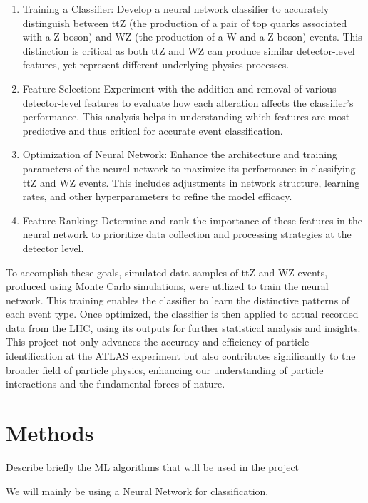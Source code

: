\documentclass[]{article}
\begin{document}
\begin{enumerate}
 \item Training a Classifier: Develop a neural network classifier to accurately distinguish between ttZ (the production of a pair of top quarks associated with a Z boson) and WZ (the production of a W and a Z boson) events. This distinction is critical as both ttZ and WZ can produce similar detector-level features, yet represent different underlying physics processes.
\item Feature Selection: Experiment with the addition and removal of various detector-level features to evaluate how each alteration affects the classifier's performance. This analysis helps in understanding which features are most predictive and thus critical for accurate event classification.
 \item Optimization of Neural Network: Enhance the architecture and training parameters of the neural network to maximize its performance in classifying ttZ and WZ events. This includes adjustments in network structure, learning rates, and other hyperparameters to refine the model efficacy.
 \item Feature Ranking: Determine and rank the importance of these features in the neural network to prioritize data collection and processing strategies at the detector level.

\end{enumerate}
To accomplish these goals, simulated data samples of ttZ and WZ events, produced using Monte Carlo simulations, were utilized to train the neural network. This training enables the classifier to learn the distinctive patterns of each event type. Once optimized, the classifier is then applied to actual recorded data from the LHC, using its outputs for further statistical analysis and insights. This project not only advances the accuracy and efficiency of particle identification at the ATLAS experiment but also contributes significantly to the broader field of particle physics, enhancing our understanding of particle interactions and the fundamental forces of nature.

\clearpage
\section{Methods}

Describe briefly the ML algorithms that will be used in the project

We will mainly be using a Neural Network for classification.
\end{document}
